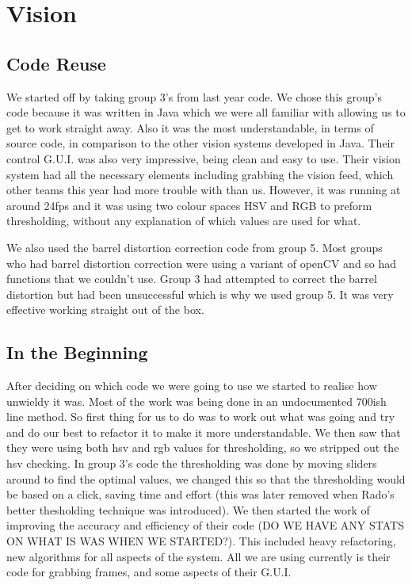\section{Vision}

\subsection{Code Reuse}

We started off by taking group 3's from last year code.  We chose this group's code because it was written in Java which we were all familiar with allowing us to get to work straight away. Also it was the most understandable, in terms of source code, in comparison to the other vision systems developed in Java.  Their control G.U.I. was also very impressive, being clean and easy to use.  Their vision system had all the necessary elements including grabbing the vision feed, which other teams this year had more trouble with than us.  However, it was running at around 24fps and it was using two colour spaces HSV and RGB to preform thresholding, without any explanation of which values are used for what. 

We also used the barrel distortion correction code from group 5.  Most groups who had barrel distortion correction were using a variant of openCV and so had functions that we couldn't use.  Group 3 had attempted to correct the barrel distortion but had been unsuccessful which is why we used group 5.  It was very effective working straight out of the box.

\subsection{In the Beginning}

After deciding on which code we were going to use we started to realise how unwieldy it was.  Most of the work was being done in an undocumented 700ish line method.  So first thing for us to do was to work out what was going and try and do our best to refactor it to make it more understandable.  We then saw that they were using both hsv and rgb values for thresholding, so we stripped out the hsv checking.  In group 3's code the thresholding was done by moving sliders around to find the optimal values, we changed this so that the thresholding would be based on a click, saving time and effort (this was later removed when Rado's better thesholding technique was introduced).  We then started the work of improving the accuracy and efficiency of their code (DO WE HAVE ANY STATS ON WHAT IS WAS WHEN WE STARTED?).  This included heavy refactoring, new algorithms for all aspects of the system.  All we are using currently is their code for grabbing frames, and some aspects of their G.U.I.

